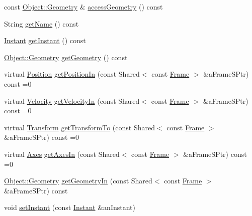 \begin{DoxyCompactItemize}
\item 
const \hyperlink{classlibrary_1_1physics_1_1env_1_1_object_abdf50733c7ad97327fb64edca5670f13}{Object\+::\+Geometry} \& \hyperlink{classlibrary_1_1physics_1_1env_1_1_object_ac7a98e912dadb573e557eb91c8f5e891}{access\+Geometry} () const
\item 
String \hyperlink{classlibrary_1_1physics_1_1env_1_1_object_ab9c4454cd7beb5a5bab5f888c0ea2f1f}{get\+Name} () const
\item 
\hyperlink{classlibrary_1_1physics_1_1time_1_1_instant}{Instant} \hyperlink{classlibrary_1_1physics_1_1env_1_1_object_a8ca9c7efb9fee9196e23d660c46adac0}{get\+Instant} () const
\item 
\hyperlink{classlibrary_1_1physics_1_1env_1_1_object_abdf50733c7ad97327fb64edca5670f13}{Object\+::\+Geometry} \hyperlink{classlibrary_1_1physics_1_1env_1_1_object_a504f76c6e6da18b531972e6f26329255}{get\+Geometry} () const
\item 
virtual \hyperlink{classlibrary_1_1physics_1_1coord_1_1_position}{Position} \hyperlink{classlibrary_1_1physics_1_1env_1_1_object_acc86d12ad94de870fc2684f7b768b617}{get\+Position\+In} (const Shared$<$ const \hyperlink{classlibrary_1_1physics_1_1coord_1_1_frame}{Frame} $>$ \&a\+Frame\+S\+Ptr) const =0
\item 
virtual \hyperlink{classlibrary_1_1physics_1_1coord_1_1_velocity}{Velocity} \hyperlink{classlibrary_1_1physics_1_1env_1_1_object_a1a8f4358db37b1b8830866373f8f3670}{get\+Velocity\+In} (const Shared$<$ const \hyperlink{classlibrary_1_1physics_1_1coord_1_1_frame}{Frame} $>$ \&a\+Frame\+S\+Ptr) const =0
\item 
virtual \hyperlink{classlibrary_1_1physics_1_1coord_1_1_transform}{Transform} \hyperlink{classlibrary_1_1physics_1_1env_1_1_object_abe850e2334c19ae185456cd52aeeca7d}{get\+Transform\+To} (const Shared$<$ const \hyperlink{classlibrary_1_1physics_1_1coord_1_1_frame}{Frame} $>$ \&a\+Frame\+S\+Ptr) const =0
\item 
virtual \hyperlink{classlibrary_1_1physics_1_1coord_1_1_axes}{Axes} \hyperlink{classlibrary_1_1physics_1_1env_1_1_object_a6807199a92fd78c10c6327b9ca654f50}{get\+Axes\+In} (const Shared$<$ const \hyperlink{classlibrary_1_1physics_1_1coord_1_1_frame}{Frame} $>$ \&a\+Frame\+S\+Ptr) const =0
\item 
\hyperlink{classlibrary_1_1physics_1_1env_1_1_object_abdf50733c7ad97327fb64edca5670f13}{Object\+::\+Geometry} \hyperlink{classlibrary_1_1physics_1_1env_1_1_object_a199472d1b6a3b6a3b1694aaddc7b3046}{get\+Geometry\+In} (const Shared$<$ const \hyperlink{classlibrary_1_1physics_1_1coord_1_1_frame}{Frame} $>$ \&a\+Frame\+S\+Ptr) const
\item 
void \hyperlink{classlibrary_1_1physics_1_1env_1_1_object_a6a215fef40593ef3dae3bf2b681339d2}{set\+Instant} (const \hyperlink{classlibrary_1_1physics_1_1time_1_1_instant}{Instant} \&an\+Instant)
\end{DoxyCompactItemize}

